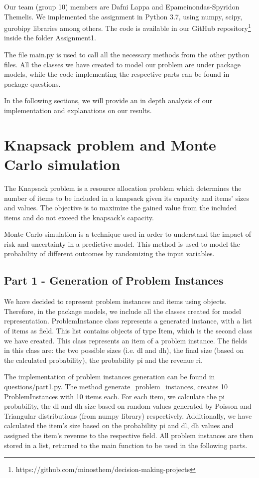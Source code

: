 \documentclass[12pt]{article}
\begin{document}
	Our team (group 10) members are Dafni Lappa and Epameinondas-Spyridon Themelis. We implemented the assignment in Python 3.7, using numpy, scipy, gurobipy libraries among others. The code is available in our GitHub repository\footnote{https://github.com/minosthem/decision-making-projects} inside the folder Assignment1. 
	
	The file main.py is used to call all the necessary methods from the other python files. All the classes we have created to model our problem are under package models, while the code implementing the respective parts can be found in package questions.
	
	In the following sections, we will provide an in depth analysis of our implementation and explanations on our results.

    \section{Knapsack problem and Monte Carlo simulation}
    
    The Knapsack problem is a resource allocation problem which determines the number of items to be included in a knapsack given its capacity and items' sizes and values. The objective is to maximize the gained value from the included items and do not exceed the knapsack's capacity.
    
    Monte Carlo simulation is a technique used in order to understand the impact of risk and uncertainty in a predictive model. This method is used to model the probability of different outcomes by randomizing the input variables. 
    
    \subsection{Part 1 - Generation of Problem Instances}
    
    We have decided to represent problem instances and items using objects. Therefore, in the package models, we include all the classes created for model representation. ProblemInstance class represents a generated instance, with a list of items as field. This list contains objects of type Item, which is the second class we have created. This class represents an item of a problem instance. The fields in this class are: the two possible sizes (i.e. dl and dh), the final size (based on the calculated probability), the probability pi and the revenue ri.
    
    The implementation of problem instances generation can be found in questions/part1.py. The method generate\_problem\_instances, creates 10 ProblemInstances with 10 items each. For each item, we calculate the pi probability, the dl and dh size based on random values generated by Poisson and Triangular distributions (from numpy library) respectively. Additionally, we have calculated the item's size based on the probability pi and dl, dh values and assigned the item's revenue to the respective field. All problem instances are then stored in a list, returned to the main function to be used in the following parts.
\end{document}
